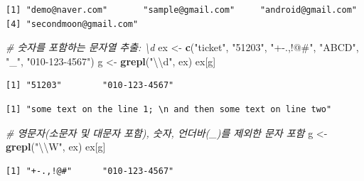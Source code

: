 \documentclass[
  11pt,
]{krantz}
\newenvironment{Shaded}{\begin{snugshade}}{\end{snugshade}}
\newcommand{\CharTok}[1]{\textcolor[rgb]{0.5,0.5,0.5}{#1}}
\newcommand{\CommentTok}[1]{\textcolor[rgb]{0.37,0.37,0.37}{\textit{#1}}}
\newcommand{\KeywordTok}[1]{\textcolor[rgb]{0.27,0.27,0.27}{\textbf{#1}}}
\newcommand{\NormalTok}[1]{#1}
\newcommand{\StringTok}[1]{\textcolor[rgb]{0.5,0.5,0.5}{#1}}
\begin{document}
\begin{verbatim}
[1] "demo@naver.com"       "sample@gmail.com"     "android@gmail.com"   
[4] "secondmoon@gmail.com"
\end{verbatim}

\begin{Shaded}
\begin{Highlighting}[]
\CommentTok{# 숫자를 포함하는 문자열 추출: \textbackslash{}d}
\NormalTok{ex <-}\StringTok{ }\KeywordTok{c}\NormalTok{(}\StringTok{"ticket"}\NormalTok{, }\StringTok{"51203"}\NormalTok{, }\StringTok{"+-.,!@#"}\NormalTok{, }\StringTok{"ABCD"}\NormalTok{, }\StringTok{"_"}\NormalTok{, }\StringTok{"010-123-4567"}\NormalTok{)}
\NormalTok{g <-}\StringTok{ }\KeywordTok{grepl}\NormalTok{(}\StringTok{"}\CharTok{\textbackslash{}\textbackslash{}}\StringTok{d"}\NormalTok{, ex)}
\NormalTok{ex[g]}
\end{Highlighting}
\end{Shaded}

\begin{verbatim}
[1] "51203"        "010-123-4567"
\end{verbatim}

\begin{Shaded}
\end{Shaded}

\begin{verbatim}
[1] "some text on the line 1; \n and then some text on line two"
\end{verbatim}

\begin{Shaded}
\begin{Highlighting}[]
\CommentTok{# 영문자(소문자 및 대문자 포함), 숫자, 언더바(_)를 제외한 문자 포함 }
\NormalTok{g <-}\StringTok{ }\KeywordTok{grepl}\NormalTok{(}\StringTok{"}\CharTok{\textbackslash{}\textbackslash{}}\StringTok{W"}\NormalTok{, ex)}
\NormalTok{ex[g]}
\end{Highlighting}
\end{Shaded}

\begin{verbatim}
[1] "+-.,!@#"      "010-123-4567"
\end{verbatim}
\end{document}
